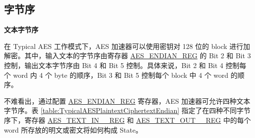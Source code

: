 \documentclass[main\_\_CN.tex]{subfiles}
\begin{document}
\subsection{字节序}

\textbf{文本字节序}

在 Typical AES 工作模式下，AES 加速器可以使用密钥对 128 位的 block 进行加解密。其中，输入文本的字节序由寄存器 \hyperref[regdesc:AESENDIANREG]{AES\_ENDIAN\_REG} 的 Bit 2 和 Bit 3 控制，输出文本字节序由 Bit 4 和 Bit 5 控制。具体来说，Bit 2 和 Bit 4 控制每个 word 内 4 个 byte 的顺序，Bit 3 和 Bit 5 控制每个 block 中 4 个 word 的顺序。

不难看出，通过配置 \hyperref[regdesc:AESENDIANREG]{AES\_ENDIAN\_REG} 寄存器，AES 加速器可允许四种文本字节序。表 \ref{table:TypicalAESPlaintextCiphertextEndian} 指定了在四种不同字节序下，寄存器 \hyperref[regdesc:AESTEXTINnREG]{AES\_TEXT\_IN\_\_REG} 和 \hyperref[regdesc:AESTEXTINnREG]{AES\_TEXT\_OUT\_\_REG} 中的每个 word 所存放的明文或密文将如何构成 State。
\end{document}
